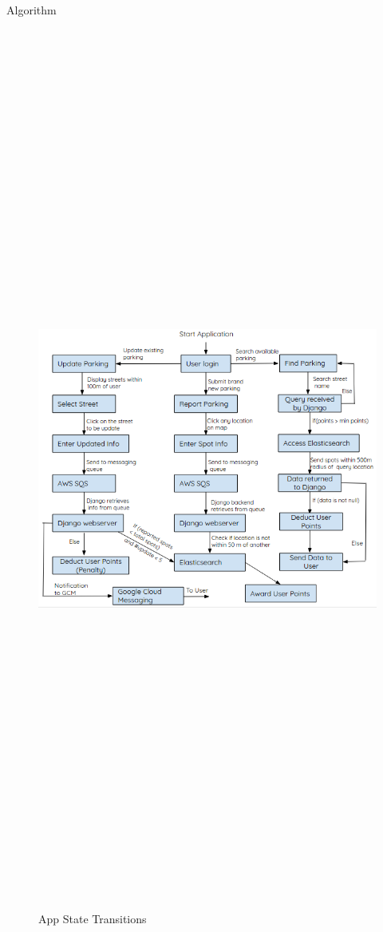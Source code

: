 \documentclass[final]{beamer}
\newlength{\twocolwid}
\begin{document}
\begin{frame}[t]
\begin{columns}[t]
\begin{column}{\twocolwid}
\begin{block}{Algorithm}
\begin{figure}
\includegraphics[width=47cm,height=40cm]{algorithm.png}
\caption{App State Transitions}
\end{figure}
\end{block}


\end{column}
\end{columns}
\end{frame}
\end{document}
